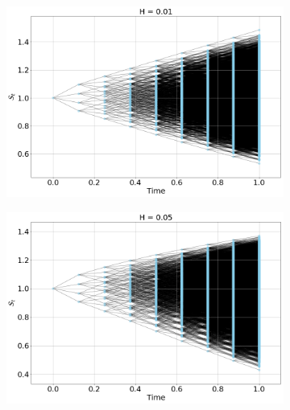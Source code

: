\documentclass[12pt]{article}
\numberwithin{equation}{section}
\begin{document}
\begin{figure}[htb!]
\begin{center}
  
  \begin{subfigure}{0.5\textwidth}
    \centering
    \includegraphics[width=1.0\textwidth]{price_tree_H001}
    \label{fig:1}
  \end{subfigure}%
  \begin{subfigure}{0.5\textwidth}
    \centering
    \includegraphics[width=1.0\textwidth]{price_tree_H005}
    \label{fig:2}
  \end{subfigure}\\
  

\end{center}
\end{figure}
\end{document}
